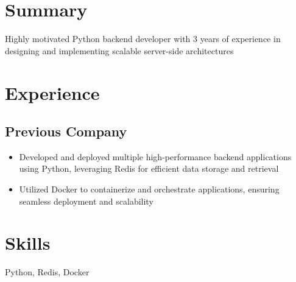 \documentclass[11pt]{article}
\begin{document}
\section*{Summary}
Highly motivated Python backend developer with 3 years of experience in designing and implementing scalable server-side architectures

\section*{Experience}
\subsection*{Previous Company}
\begin{itemize}
\item Developed and deployed multiple high-performance backend applications using Python, leveraging Redis for efficient data storage and retrieval
\item Utilized Docker to containerize and orchestrate applications, ensuring seamless deployment and scalability
\end{itemize}

\section*{Skills}
Python, Redis, Docker
\end{document}
